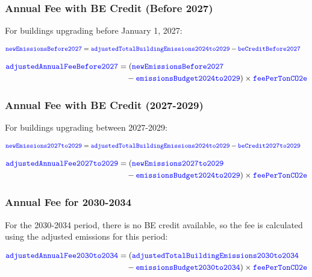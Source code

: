 \documentclass{article}
\newcommand{\code}[1]{\textcolor{blue}{\texttt{#1}}}
\begin{document}
\subsubsection{Annual Fee with BE Credit (Before 2027)}

For buildings upgrading before January 1, 2027:

\begin{align}
\code{newEmissionsBefore2027} &= \code{adjustedTotalBuildingEmissions2024to2029} - \code{beCreditBefore2027}
\end{align}

\begin{align}
\code{adjustedAnnualFeeBefore2027} &= (\code{newEmissionsBefore2027} \nonumber\\
&\quad - \code{emissionsBudget2024to2029}) \times \code{feePerTonCO2e}
\end{align}

\subsubsection{Annual Fee with BE Credit (2027-2029)}

For buildings upgrading between 2027-2029:

\begin{align}
\code{newEmissions2027to2029} &= \code{adjustedTotalBuildingEmissions2024to2029} - \code{beCredit2027to2029}
\end{align}

\begin{align}
\code{adjustedAnnualFee2027to2029} &= (\code{newEmissions2027to2029} \nonumber\\
&\quad - \code{emissionsBudget2024to2029}) \times \code{feePerTonCO2e}
\end{align}

\subsubsection{Annual Fee for 2030-2034}

For the 2030-2034 period, there is no BE credit available, so the fee is calculated using the adjusted emissions for this period:

\begin{align}
\code{adjustedAnnualFee2030to2034} &= (\code{adjustedTotalBuildingEmissions2030to2034} \nonumber\\
&\quad - \code{emissionsBudget2030to2034}) \times \code{feePerTonCO2e}
\end{align}
\end{document}
